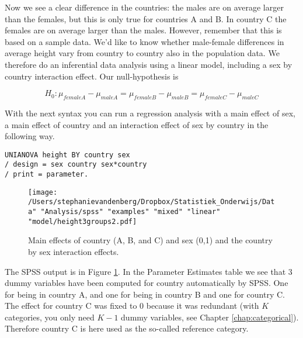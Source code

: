 \begin{knitrout}
\color{fgcolor}\begin{kframe}


{\ttfamily\noindent\bfseries{}}\end{kframe}
\end{knitrout}

Now we see a clear difference in the countries: the males are on average larger than the females, but this is only true for countries A and B. In country C the females are on average larger than the males. However, remember that this is based on a sample data. We'd like to know whether male-female differences in average height vary from country to country also in the population data. We therefore do an inferential data analysis using a linear model, including a sex by country interaction effect. Our null-hypothesis is 

\begin{equation}
H_0: \mu_{femaleA}-\mu_{maleA}=\mu_{femaleB}-\mu_{maleB}=\mu_{femaleC}-\mu_{maleC}
\end{equation}


With the next syntax you can run a regression analysis with a main effect of sex, a main effect of country and an interaction effect of sex by country in the following way.

\begin{verbatim}
UNIANOVA height BY country sex 
/ design = sex country sex*country
/ print = parameter.
\end{verbatim}


\begin{figure}[h]
    \begin{center}
       \texttt{[image: /Users/stephanievandenberg/Dropbox/Statistiek\_Onderwijs/Data" "Analysis/spss" "examples" "mixed" "linear" "model/height3groups2.pdf]}
    \end{center}
    \caption{Main effects of country (A, B, and C) and sex (0,1) and the country by sex interaction effects.}
     \label{fig:interactionheight3group}
\end{figure}

The SPSS output is in Figure \ref{fig:interactionheight3group}. In the Parameter Estimates table we see that 3 dummy variables have been computed for country automatically by SPSS. One for being in country A, and one for being in country B and one for country C. The effect for country C was fixed to 0 because it was redundant (with $K$ categories, you only need $K-1$ dummy variables, see Chapter \ref{chap:categorical}). Therefore country C is here used as the so-called reference category. 

